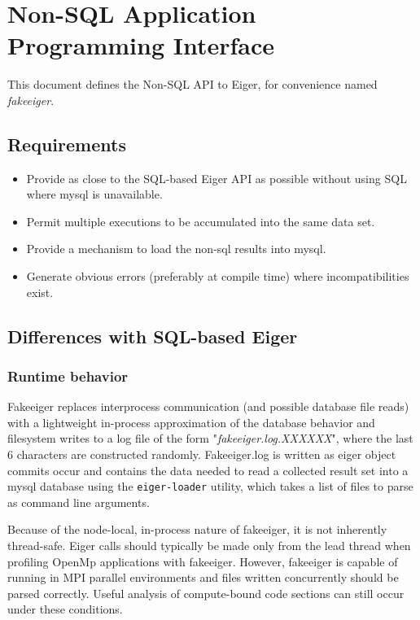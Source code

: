 \section{Non-SQL Application Programming Interface}
\label{sec:fakeapi}
This document defines the Non-SQL API to Eiger, for convenience named {\em fakeeiger}.

\subsection{Requirements}

\begin{itemize}
\item Provide as close to the SQL-based Eiger API as possible without using SQL where mysql is unavailable.

\item Permit multiple executions to be accumulated into the same data set.

\item Provide a mechanism to load the non-sql results into mysql.
 
\item Generate obvious errors (preferably at compile time) where incompatibilities exist.

\end{itemize}

\subsection{Differences with SQL-based Eiger}

\subsubsection {Runtime behavior} 
Fakeeiger replaces interprocess communication (and possible database file reads)  with a lightweight in-process approximation of the database behavior and filesystem writes to a log file of the form "{\em fakeeiger.log.XXXXXX}", where the last 6 characters are constructed randomly. Fakeeiger.log is written as eiger object commits occur and contains the data needed to read a collected result set into a mysql database using the \texttt{eiger-loader} utility, which takes a list of files to parse as command line arguments.  

Because of the node-local, in-process nature of fakeeiger, it is not inherently thread-safe. Eiger calls should typically be made only from the lead thread when profiling OpenMp applications with fakeeiger. However, fakeeiger is capable of running in MPI parallel environments and files written concurrently should be parsed correctly. Useful analysis of compute-bound code sections can still occur under these conditions.


